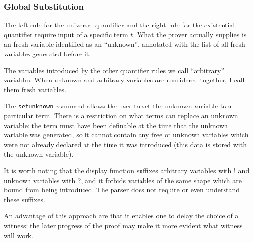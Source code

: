 \documentclass{article}
\begin{document}
\subsubsection{Global Substitution}

The left rule for the universal quantifier and the right rule for the
existential quantifier require input of a specific term $t$.  What the
prover actually supplies is an fresh variable identified as an ``unknown'', annotated with the list of all fresh variables generated before it.

The variables introduced by the other quantifier rules we call ``arbitrary'' variables.  When unknown and arbitrary variables are considered together, I call them fresh variables.

The {\tt setunknown} command allows the user to set the unknown
variable to a particular term.  There is a restriction on what terms
can replace an unknown variable: the term must have been definable at
the time that the unknown variable was generated, so it
cannot contain any free or unknown variables which were not already declared at the time it was introduced (this data is stored with the unknown variable).

It is worth noting that the display function suffixes arbitrary variables with ! and unknown variables with ?, and it forbids variables of the same shape which are bound from being introduced.  The parser does not require or even understand these suffixes.

An advantage of this approach are that it enables one to delay the
choice of a witness: the later progress of the proof may make it more
evident what witness will work.
\end{document}
